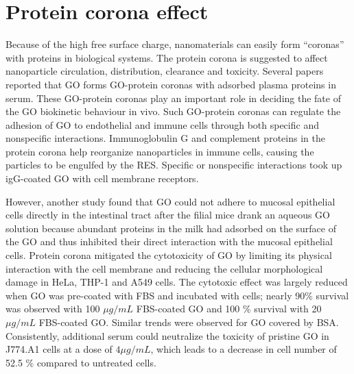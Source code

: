 \documentclass[twoside,twocolumn,9pt]{article}
\begin{document}
\section{Protein corona effect} Because of the high free surface charge, nanomaterials can easily form “coronas” with proteins in biological systems. The protein corona is suggested to affect nanoparticle circulation, distribution, clearance and toxicity. Several papers reported that GO forms GO-protein coronas with adsorbed plasma proteins in serum. These GO-protein coronas play an important role in deciding the fate of the GO biokinetic behaviour in vivo. Such GO-protein coronas can regulate the adhesion of GO to endothelial and immune cells through both specific and nonspecific interactions. Immunoglobulin G and complement proteins in the protein corona help reorganize nanoparticles in immune cells, causing the particles to be engulfed by the RES. Specific or nonspecific interactions took up igG-coated GO with cell membrane receptors.

However, another study found that GO could not adhere to mucosal epithelial cells directly in the intestinal tract after the filial mice drank an aqueous GO solution because abundant proteins in the milk had adsorbed on the surface of the GO and thus inhibited their direct interaction with the mucosal epithelial cells. Protein corona mitigated the cytotoxicity of GO by limiting its physical interaction with the cell membrane and reducing the cellular morphological damage in HeLa, THP-1 and A549 cells. The cytotoxic effect was largely reduced when GO was pre-coated with FBS and incubated with cells; nearly 90\% survival was observed with 100 $\mu g/mL$ FBS-coated GO and 100 \% survival with 20 $\mu g/mL$ FBS-coated GO. Similar trends were observed for GO covered by BSA. Consistently, additional serum could neutralize the toxicity of pristine GO in J774.A1 cells at a dose of $4 \mu g/mL$, which leads to a decrease in cell number of 52.5 \% compared to untreated cells.
\end{document}
